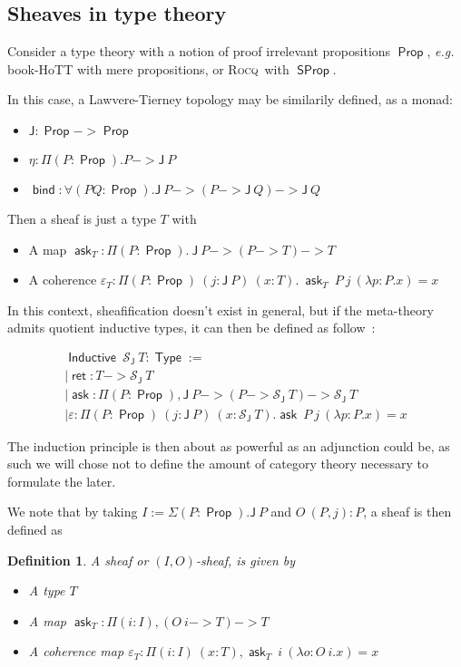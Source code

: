 \documentclass[11pt]{article}
\newtheorem{definition}[theorem]{Definition}
\DeclareMathOperator{\Prop}{\mathsf{Prop}}
\DeclareMathOperator{\SProp}{\mathsf{SProp}}
\DeclareMathOperator{\Type}{\mathsf{Type}}
\DeclareMathOperator{\ask}{\mathsf{ask}}
\DeclareMathOperator{\bind}{\mathsf{bind}}
\DeclareMathOperator{\Inductive}{\mathsf{Inductive}}
\DeclareMathOperator{\ret}{\mathsf{ret}}
\newcommand{\0}{\mathbf{0}}
\newcommand{\1}{\mathbf{1}}
\newcommand{\rocq}{\textsc{Rocq}}
\begin{document}
\subsection{Sheaves in type theory}\label{shfinTT}

Consider a type theory with a notion of proof irrelevant propositions $\Prop$, \emph{e.g.} book-HoTT with mere propositions, or \rocq\ with $\SProp$.

In this case, a Lawvere-Tierney topology may be similarily defined, as a monad:
\begin{itemize}
    \item $\mathsf{J} : \Prop -> \Prop$
    \item $\eta : \Pi (P:\Prop).P -> \mathsf{J}\ P$
    \item $\bind : \forall (P Q: \Prop). \mathsf{J}\ P -> (P -> \mathsf{J}\ Q) -> \mathsf{J}\ Q$
\end{itemize}

Then a sheaf is just a type $T$ with 
\begin{itemize}
    \item A map $\ask_T : \Pi (P:\Prop).\ \mathsf{J}\ P -> (P -> T) -> T$
    \item A coherence $\varepsilon_T : \Pi (P:\Prop)\ (j : \mathsf{J}\ P)\ (x:T).\ \ask_T\ P\ j\ (\lambda p:P.x) = x$
\end{itemize}

In this context, sheafification doesn't exist in general, but if the meta-theory admits quotient inductive types, it can then be defined as follow~:

$$
\begin{array}{l}
    \Inductive\ \mathcal{S}_{\mathsf{J}}\ T : \Type := \\
    \mid \ret : T -> \mathcal{S}_{\mathsf{J}}\ T\\
    \mid \ask : \Pi (P:\Prop), \mathsf{J}\ P -> (P -> \mathcal{S}_{\mathsf{J}}\ T) -> \mathcal{S}_{\mathsf{J}}\ T\\
    \mid \varepsilon : \Pi (P:\Prop)\ (j : \mathsf J\ P)\ (x : \mathcal{S}_{\mathsf{J}}\ T). \ask\ P\ j\ (\lambda p:P. x) = x
\end{array}
$$

The induction principle is then about as powerful as an adjunction could be, as such we will chose not to define the amount of category theory necessary to formulate the later.

We note that by taking $I := \Sigma (P:\Prop). \mathsf{J}\ P$ and $O\ (P,j) : P$, a sheaf is then defined as
\begin{definition}\label{IOshf}
    A \emph{sheaf} or \emph{$(I,O)$-sheaf}, is given by
\begin{itemize}
    \item A type $T$
    \item A map $\ask_T : \Pi (i:I), (O\ i -> T) -> T$
    \item A coherence map $\varepsilon_T : \Pi(i:I)\ (x:T), \ask_T\ i\ (\lambda o:O\  i.x) = x$
\end{itemize}

\end{definition}
\end{document}
